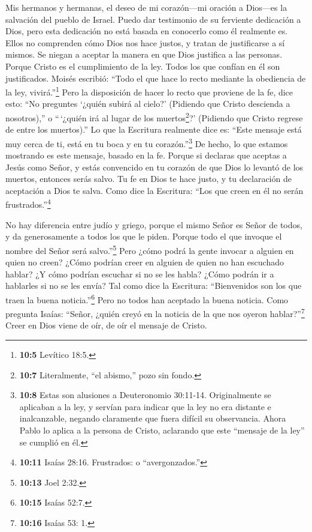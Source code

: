  Mis hermanos y hermanas, el deseo de mi corazón---mi
oración a Dios---es la salvación del pueblo de Israel. 
Puedo dar testimonio de su ferviente dedicación a Dios, pero esta
dedicación no está basada en conocerlo como él realmente es.
 Ellos no comprenden cómo Dios nos hace justos, y tratan de
justificarse a sí mismos. Se niegan a aceptar la manera en que Dios
justifica a las personas.  Porque Cristo es el cumplimiento
de la ley. Todos los que confían en él son justificados. 
Moisés escribió: ``Todo el que hace lo recto mediante la obediencia de
la ley, vivirá.''\footnote{\textbf{10:5} Levítico 18:5.} 
Pero la disposición de hacer lo recto que proviene de la fe, dice esto:
``No preguntes `¿quién subirá al cielo?' (Pidiendo que Cristo descienda
a nosotros),''  o ``\,`¿quién irá al lugar de los
muertos\footnote{\textbf{10:7} Literalmente, ``el abismo,'' pozo sin
  fondo.}?' (Pidiendo que Cristo regrese de entre los muertos).''
 Lo que la Escritura realmente dice es: ``Este mensaje está
muy cerca de ti, está en tu boca y en tu corazón.''\footnote{\textbf{10:8}
  Estas son alusiones a Deuteronomio 30:11-14. Originalmente se
  aplicaban a la ley, y servían para indicar que la ley no era distante
  e inalcanzable, negando claramente que fuera difícil su observancia.
  Ahora Pablo lo aplica a la persona de Cristo, aclarando que este
  ``mensaje de la ley'' se cumplió en él.} De hecho, lo que estamos
mostrando es este mensaje, basado en la fe.  Porque si
declaras que aceptas a Jesús como Señor, y estás convencido en tu
corazón de que Dios lo levantó de los muertos, entonces serás salvo.
 Tu fe en Dios te hace justo, y tu declaración de
aceptación a Dios te salva.  Como dice la Escritura: ``Los
que creen en él no serán frustrados.''\footnote{\textbf{10:11} Isaías
  28:16. Frustrados: o ``avergonzados.''}

 No hay diferencia entre judío y griego, porque el mismo
Señor es Señor de todos, y da generosamente a todos los que le piden.
 Porque todo el que invoque el nombre del Señor será
salvo.''\footnote{\textbf{10:13} Joel 2:32.}  Pero ¿cómo
podrá la gente invocar a alguien en quien no creen? ¿Cómo podrían creer
en alguien de quien no han escuchado hablar? ¿Y cómo podrían escuchar si
no se les habla?  ¿Cómo podrán ir a hablarles si no se les
envía? Tal como dice la Escritura: ``Bienvenidos son los que traen la
buena noticia.''\footnote{\textbf{10:15} Isaías 52:7.} 
Pero no todos han aceptado la buena noticia. Como pregunta Isaías:
``Señor, ¿quién creyó en la noticia de la que nos oyeron
hablar?''\footnote{\textbf{10:16} Isaías 53: 1.}  Creer en
Dios viene de oír, de oír el mensaje de Cristo.

